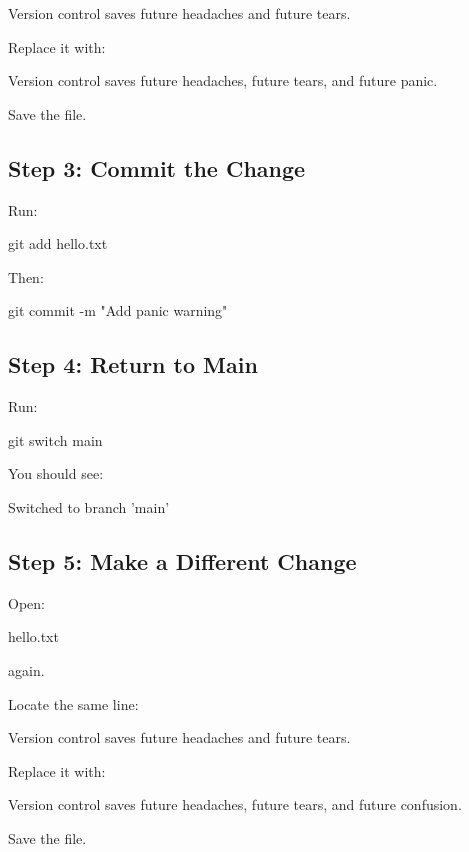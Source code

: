 \documentclass{csc2059practical}
\begin{document}
\begin{terminalplain}
Version control saves future headaches and future tears.
\end{terminalplain}
Replace it with:

\begin{terminalplain}
Version control saves future headaches, future tears, and future panic.
\end{terminalplain}
Save the file.

\subsection{Step 3: Commit the Change}
Run:

\begin{terminalplain}
git add hello.txt
\end{terminalplain}
Then:

\begin{terminalplain}
git commit -m "Add panic warning"
\end{terminalplain}
\subsection{Step 4: Return to Main}
Run:

\begin{terminalplain}
git switch main
\end{terminalplain}
You should see:

\begin{terminalplain}
Switched to branch 'main'
\end{terminalplain}
\subsection{Step 5: Make a Different Change}
Open:

\begin{terminalplain}
hello.txt
\end{terminalplain}
again.

Locate the same line:

\begin{terminalplain}
Version control saves future headaches and future tears.
\end{terminalplain}
Replace it with:

\begin{terminalplain}
Version control saves future headaches, future tears, and future confusion.
\end{terminalplain}
Save the file.
\end{document}
